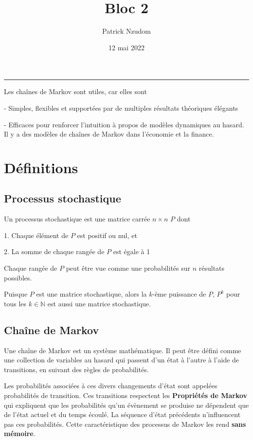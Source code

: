 \documentclass[10pt]{article}
\author{	
	Patrick Nzudom
     }
\title{Bloc 2}
\date{12 mai 2022}
\begin{document}
\maketitle

\rule{\linewidth}{.5pt}

\tableofcontents

Les chaînes de Markov sont utiles,  car elles sont

- Simples, flexibles et supportées par de multiples résultats théoriques élégants


- Efficaces pour renforcer l'intuition à propos de modèles dynamiques au hasard. Il y a des modèles de chaînes de Markov dans l'économie et la finance.

\section{Définitions}

\subsection{Processus stochastique}

Un processus stochastique est une matrice carrée $ n \times n $ $ P $ dont

1. Chaque élément de $ P $ est positif ou nul,  et


2. La somme de chaque rangée de $ P $ est égale à 1

Chaque rangée de $ P $ peut être vue comme une probabilités sur $ n $ résultats possibles\cite{hockey}.

Puisque $ P $ est une matrice stochastique,  alors la $ k $-ème puissance de $P$,  $ P^k $ pour tous les $ k \in  \mathbb N $ est aussi une matrice stochastique.

\subsection{Chaîne de Markov}

Une chaîne de Markov est un système mathématique.  Il peut être défini comme une collection de variables au hasard qui passent d'un état à l'autre à l'aide de transitions,  en suivant des règles de probabilités. 

Les probabilités associées à ces divers changements d'état sont appelées probabilités de transition\cite{Markov}. Ces transitions respectent les \textbf{Propriétés de Markov} qui expliquent que les probabilités qu'un évènement se produise ne dépendent que de l'état actuel et du temps écoulé.  La séquence d'état précédents n'influencent pas ces probabilités. Cette caractéristique des processus de Markov les rend \textbf{sans mémoire}.
\end{document}

